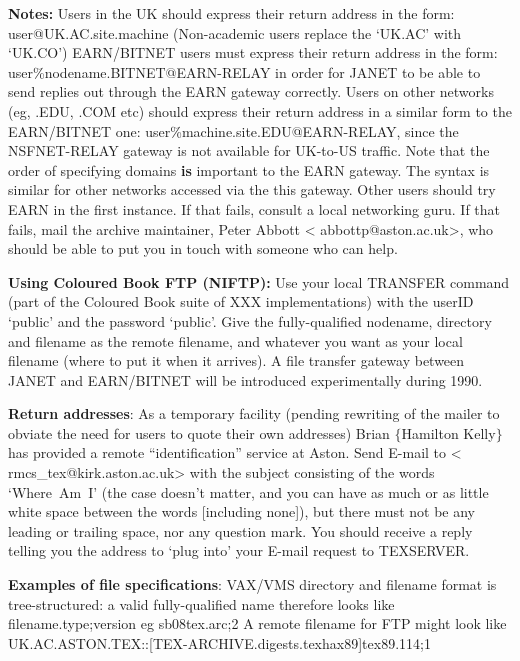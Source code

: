 {\bf Notes:} Users in the UK should express their return address in
     the form:\nl
{\tx user@UK.AC.site.machine} (Non-academic users replace the
     `{\tx UK.AC}' with `{\tx UK.CO}')\nl
     EARN/BITNET users must express their return address in the form:\nl
{\tx user\%nodename.BITNET@EARN-RELAY} in order for JANET to be able to
     send replies out through the EARN gateway correctly.\nl
     Users on other networks (eg, {\tx .EDU}, {\tx .COM} etc) should
     express their return address in a similar form to the EARN/BITNET
     one: {\tx user\%machine.site.EDU@EARN-RELAY}, since the
     NSFNET-RELAY gateway is not available for UK-to-US traffic.\nl
     Note that the order of specifying domains {\bf is} important to the
     EARN gateway. The syntax is similar for other networks accessed via
     the this gateway. Other users should try EARN in the first
     instance. If that fails, consult a local networking guru. If that
     fails, mail the archive maintainer, Peter Abbott <{\tx
     abbottp@aston.ac.uk}>, who should be able to put you in touch with
     someone who can help.

{\bf Using Coloured Book FTP (NIFTP):} Use your local {\tx TRANSFER}
     command (part of the Coloured Book suite of XXX implementations)
     with the userID `{\tx public}' and the password `{\tx public}'.
     Give the fully-qualified nodename, directory and filename as the
     remote filename, and whatever you want as your local filename
     (where to put it when it arrives). A file transfer gateway between
     JANET and EARN/BITNET will be introduced experimentally during
     1990.

{\bf Return addresses}: As a temporary facility (pending rewriting of
     the mailer to obviate the need for users to quote their own
     addresses) Brian $\{$Hamilton Kelly$\}$ has provided a remote
     ``identification'' service at Aston. Send E-mail to <{\tx
     rmcs\_tex@kirk.aston.ac.uk}> with the subject consisting of the
     words `{\tx Where~Am~I}' (the case doesn't matter, and you can have
     as much or as little white space between the words [including
     none]), but there must not be any leading or trailing space, nor
     any question mark. You should receive a reply telling you the
     address to `plug into' your E-mail request to TEXSERVER.

{\bf Examples of file specifications}:\nl
     VAX/VMS directory and filename format is tree-structured: a valid
     fully-qualified name therefore looks like\nl
{filename.type;version}\quad
     eg\nl
{sb08tex.arc;2}\nl
     A remote filename for FTP might look like\nl
{\tx UK.AC.ASTON.TEX::[TEX-ARCHIVE.digests.texhax89]tex89.114;1}

